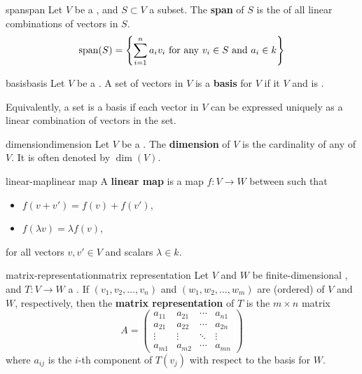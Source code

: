 \begin{topic}{span}{span}
    Let $V$ be a , and $S \subset V$ a subset. The \textbf{span} of $S$ is the  of all linear combinations of vectors in $S$.
    \[ \textup{span}(S) = \left\{ \sum_{i = 1}^{n} a_i v_i \textup{ for any } v_i \in S \textup{ and } a_i \in k \right\} \]
\end{topic}

\begin{topic}{basis}{basis}
    Let $V$ be a . A set of vectors in $V$ is a \textbf{basis} for $V$ if it  $V$ and is .
    
    Equivalently, a set is a basis if each vector in $V$ can be expressed uniquely as a linear combination of vectors in the set.
\end{topic}

\begin{topic}{dimension}{dimension}
    Let $V$ be a . The \textbf{dimension} of $V$ is the cardinality of any  of $V$. It is often denoted by $\dim(V)$.
\end{topic}

\begin{topic}{linear-map}{linear map}
    A \textbf{linear map} is a map $f : V \to W$ between  such that
    \begin{itemize}
        \item $f(v + v') = f(v) + f(v')$,
        \item $f(\lambda v) = \lambda f(v)$,
    \end{itemize}
    for all vectors $v, v' \in V$ and scalars $\lambda \in k$.
\end{topic}

\begin{topic}{matrix-representation}{matrix representation}
    Let $V$ and $W$ be finite-dimensional , and $T : V \to W$ a . If $(v_1, v_2, \ldots, v_n)$ and $(w_1, w_2, \ldots, w_m)$ are (ordered)  of $V$ and $W$, respectively, then the \textbf{matrix representation} of $T$ is the $m \times n$ matrix
    \[ A = \begin{pmatrix} a_{11} & a_{21} & \cdots & a_{n1} \\ a_{21} & a_{22} & \cdots & a_{2n} \\ \vdots & \vdots & \ddots & \vdots \\ a_{m1} & a_{m2} & \cdots & a_{mn} \end{pmatrix} \]
    where $a_{ij}$ is the $i$-th component of $T(v_j)$ with respect to the basis for $W$.
\end{topic}

